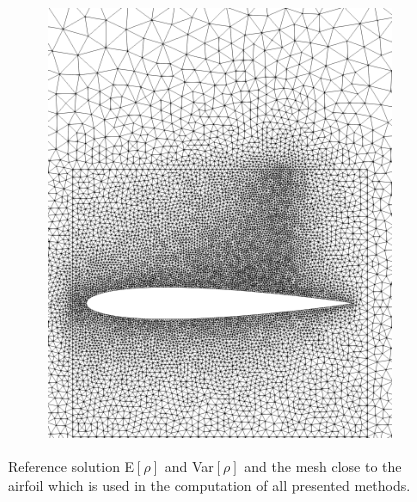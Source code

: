\begin{figure}[h!]
\begin{subfigure}{0.3\linewidth}
		\includegraphics[scale=0.2]{figs/Euler1DPlots5/naca_mesh.png}
		\label{fig:referenceSolutionsMesh}
	\end{subfigure}
	\caption{Reference solution E$[\rho]$ and Var$[\rho]$ and the mesh close to the airfoil which is used in the computation of all presented methods.}
	\label{fig:referenceSolution}
\end{figure}

